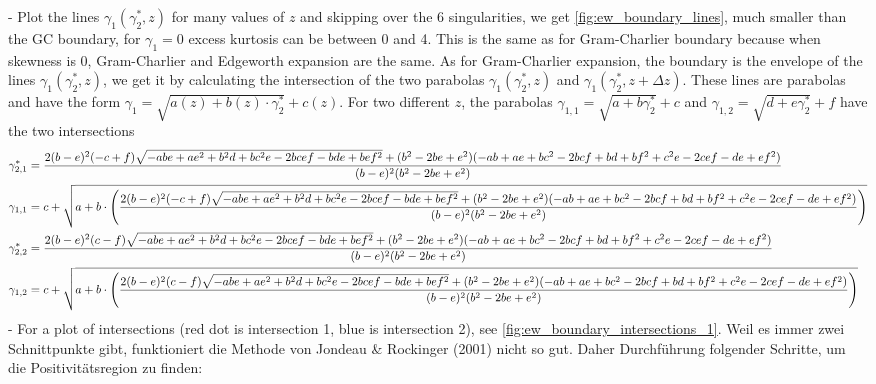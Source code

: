 - Plot the lines $\gamma_1(\gamma_2^*, z)$ for many values of $z$ and skipping over the 6 singularities, we get \ref{fig:ew_boundary_lines}, much smaller than the GC boundary, for $\gamma_1 = 0$ excess kurtosis can be between 0 and 4. This is the same as for Gram-Charlier boundary because when skewness is 0, Gram-Charlier and Edgeworth expansion are the same. As for Gram-Charlier expansion, the boundary is the envelope of the lines $\gamma_1(\gamma_2^*, z)$, we get it by calculating the intersection of the two parabolas $\gamma_1(\gamma_2^*, z)$ and $\gamma_1(\gamma_2^*, z+\Delta z)$. These lines are parabolas and have the form $\gamma_1 = \sqrt{a(z) + b(z)\cdot \gamma_2^*} + c(z)$. For two different $z$, the parabolas $\gamma_{1,1} = \sqrt{a+b\gamma_2^*}+c$ and $\gamma_{1,2}=\sqrt{d+e\gamma_2^*}+f$ have the two intersections
\begin{align}
    \gamma_{2,1}^* &= \frac{2(b - e)^2(-c + f)\sqrt{-ab e + ae^2 + b^2 d + b c^2 e - 2 b c ef - bd e + b e f^2} + (b^2 - 2be + e^2)(-ab + ae + bc^2 - 2bcf + bd + bf^2 + c^2e - 2cef - de + ef^2)}{(b - e)^2(b^2 - 2be + e^2)} \notag \\
    \gamma_{1,1} &= c + \sqrt{a + b \cdot \left(\frac{2(b - e)^2(-c + f)\sqrt{-ab e + ae^2 + b^2 d + b c^2 e - 2 b c ef - bd e + b e f^2} + (b^2 - 2be + e^2)(-ab + ae + bc^2 - 2bcf + bd + bf^2 + c^2e - 2cef - de + ef^2)}{(b - e)^2(b^2 - 2be + e^2)}\right)} \notag \\
    \gamma_{2,2}^* &= \frac{2(b - e)^2(c - f)\sqrt{-ab e + ae^2 + b^2 d + b c^2 e - 2 b c ef - bd e + b e f^2} + (b^2 - 2be + e^2)(-ab + ae + bc^2 - 2bcf + bd + bf^2 + c^2e - 2cef - de + ef^2)}{(b - e)^2(b^2 - 2be + e^2)} \notag \\
    \gamma_{1,2} &= c + \sqrt{a + b \cdot \left(\frac{2(b - e)^2(c - f)\sqrt{-ab e + ae^2 + b^2 d + b c^2 e - 2 b c ef - bd e + b e f^2} + (b^2 - 2be + e^2)(-ab + ae + bc^2 - 2bcf + bd + bf^2 + c^2e - 2cef - de + ef^2)}{(b - e)^2(b^2 - 2be + e^2)}\right)} \notag
\end{align}
- For a plot of intersections (red dot is intersection 1, blue is intersection 2), see \ref{fig:ew_boundary_intersections_1}. Weil es immer zwei Schnittpunkte gibt, funktioniert die Methode von Jondeau & Rockinger (2001) nicht so gut. Daher Durchführung folgender Schritte, um die Positivitätsregion zu finden:
